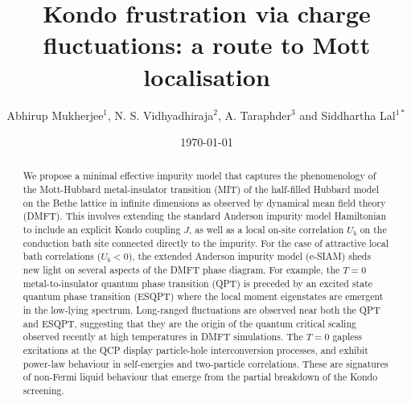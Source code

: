 \documentclass{iopart}
\begin{document}
\title{Kondo frustration via charge fluctuations: a route to Mott localisation}

\author{Abhirup Mukherjee$^{1}$, N. S. Vidhyadhiraja$^{2}$, A. Taraphder$^{3}$ and Siddhartha Lal$^{1*}$}

\address{$^1$Department of Physical Sciences, Indian Institute of Science Education and Research-Kolkata, W.B. 741246, India}

\address{$^*$Corresponding author.}

\address{$^2$Theoretical Sciences Unit, Jawaharlal Nehru Center for Advanced Scientific Research, Jakkur, Bengaluru 560064, India}

\address{$^3$Department of Physics, Indian Institute of Technology Kharagpur, Kharagpur 721302, India}

\date{\today}

\begin{abstract}
We propose a minimal effective impurity model that captures the phenomenology of the Mott-Hubbard metal-insulator transition (MIT) of the half-filled Hubbard model on the Bethe lattice in infinite dimensions as observed by dynamical mean field theory (DMFT). This involves extending the standard Anderson impurity model Hamiltonian to include an explicit Kondo coupling $J$, as well as a local on-site correlation \(U_b\) on the conduction bath site connected directly to the impurity. For the case of attractive local bath correlations ($U_{b}<0$), the extended Anderson impurity model (e-SIAM) sheds new light on several aspects of the DMFT phase diagram. For example, the $T=0$ metal-to-insulator quantum phase transition (QPT) is preceded by an excited state quantum phase transition (ESQPT) where the local moment eigenstates are emergent in the low-lying spectrum. Long-ranged fluctuations are observed near both the QPT and ESQPT, suggesting that they are the origin of the quantum critical scaling observed recently at high temperatures in DMFT simulations. The \(T=0\) gapless excitations at the QCP display particle-hole interconversion processes, and exhibit power-law behaviour in self-energies and two-particle correlations. These are signatures of non-Fermi liquid behaviour that emerge from the partial breakdown of the Kondo screening.
\end{abstract}

\maketitle
\end{document}
